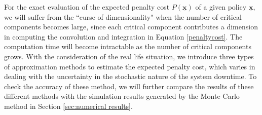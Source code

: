 \documentclass[preprint,12pt]{elsarticle}
\begin{document}
For the exact evaluation of the expected penalty cost $P(\underline{\boldsymbol{x}})$ of a given policy $\underline{\boldsymbol{x}}$, we will suffer from the ``curse of dimensionality" when the number of critical components becomes large, since each critical component contributes a dimension in computing the convolution and integration in Equation \eqref{penaltycost}. The computation time will become intractable as the number of critical components grows. With the consideration of the real life situation, we introduce three types of approximation methods to estimate the expected penalty cost, which varies in dealing with the uncertainty in the stochastic nature of the system downtime. To check the accuracy of these method, we will further compare the results of these different methods with the simulation results generated by the Monte Carlo method in Section \ref{sec:numerical results}.
\end{document}
